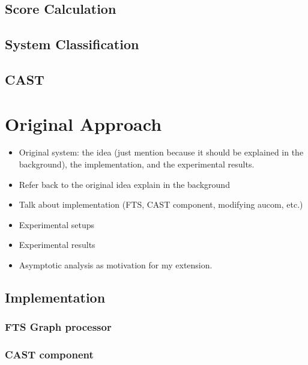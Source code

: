 \documentclass[11pt,a4paper]{article}
\begin{document}
\subsection{Score Calculation}
\subsection{System Classification}
\subsection{CAST}



\section{Original Approach}
\label{cha:orig-approach}

\begin{itemize}
\item Original system: the idea (just mention because it should be
  explained in the background), the implementation, and the
  experimental results.
\item Refer back to the original idea explain in the background
\item Talk about implementation (FTS, CAST component, modifying aucom, etc.)
\item Experimental setups
\item Experimental results
\item Asymptotic analysis as motivation for my extension.
\end{itemize}

\subsection{Implementation}
\subsubsection{FTS Graph processor}
\subsubsection{CAST component}
\end{document}
